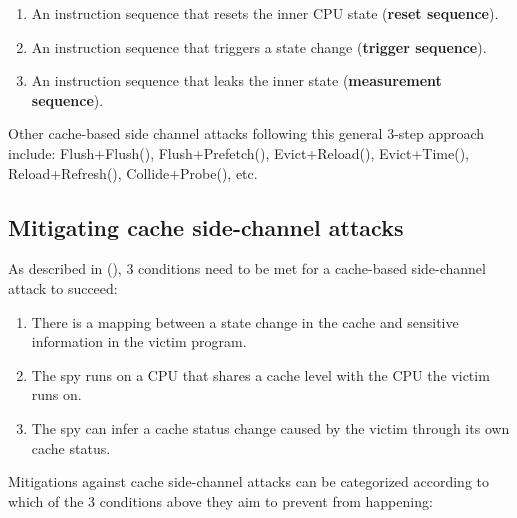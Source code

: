 \documentclass[
  a4paper,
]{report}
\providecommand{\tightlist}{%
  \setlength{\itemsep}{0pt}\setlength{\parskip}{0pt}}
\begin{document}
\begin{enumerate}
\def\labelenumi{\arabic{enumi}.}
\tightlist
\item
  An instruction sequence that resets the inner CPU state (\textbf{reset
  sequence}).
\item
  An instruction sequence that triggers a state change (\textbf{trigger
  sequence}).
\item
  An instruction sequence that leaks the inner state
  (\textbf{measurement sequence}).
\end{enumerate}

Other cache-based side channel attacks following this general 3-step
approach include:
Flush+Flush(),
Flush+Prefetch(),
Evict+Reload(), Evict+Time(),
Reload+Refresh(),
Collide+Probe(), etc.

\subsection{Mitigating cache side-channel
attacks}\label{mitigating-cache-side-channel-attacks}

As described in (), 3 conditions
need to be met for a cache-based side-channel attack to succeed:

\begin{enumerate}
\def\labelenumi{\arabic{enumi}.}
\tightlist
\item
  There is a mapping between a state change in the cache and sensitive
  information in the victim program.
\item
  The spy runs on a CPU that shares a cache level with the CPU the
  victim runs on.
\item
  The spy can infer a cache status change caused by the victim through
  its own cache status.
\end{enumerate}

Mitigations against cache side-channel attacks can be categorized
according to which of the 3 conditions above they aim to prevent from
happening:
\end{document}
